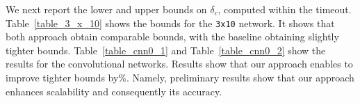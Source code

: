 We next report the lower and upper bounds on $\delta_c$, computed within the timeout.
Table~\ref{table_3_x_10} shows the bounds for the \texttt{3x10} network. It shows that both approach obtain comparable bounds, with the baseline obtaining slightly tighter bounds. Table~\ref{table_cnn0_1} and Table~\ref{table_cnn0_2} show the results for the convolutional networks. Results show that our approach enables to improve tighter bounds by\%. %
Namely, preliminary results show that our approach enhances scalability and consequently its accuracy. %

\begin{table}[H]
	\centering
\caption{The lower and upper bounds for 3X10 architecture 
		\label{table_3_x_10}}
\end{table}


